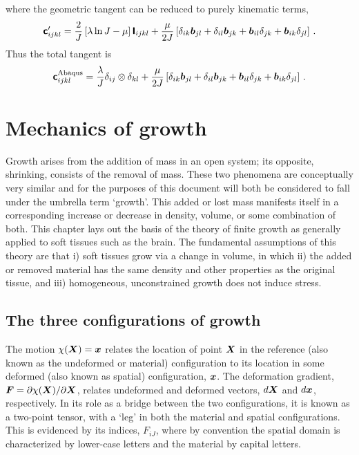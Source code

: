 \documentclass[10pt,letterpaper,oneside]{report}
\newcommand{\ten}[1]{\mbox{\boldmath $#1$}{}}
\newcommand{\tenf}[1]{\mbox{{\sffamily{\bfseries {#1}}}}}
\newcommand{\scas}[1]{\mbox{{\scriptsize{${\rm{#1}}$}}}{}}
\begin{document}
where the geometric tangent can be reduced to purely kinematic terms, 
\begin{equation}
\tenf{c}'_{ijkl} = \frac{2}{J} \left[ \lambda \ln J - \mu \right] \tenf{I}_{ijkl} + \frac{\mu}{2 J} \left[ \delta_{ik} \ten{b}_{jl} + \delta_{il} \ten{b}_{jk} + \ten{b}_{il} \delta_{jk} + \ten{b}_{ik} \delta_{jl} \right] \, . 
\end{equation}
Thus the total tangent is
\begin{equation}
\tenf{c}^{\scas{Abaqus}}_{ijkl} = \frac{\lambda}{J} \delta_{ij} \otimes \delta_{kl} + \frac{\mu}{2 J} \left[ \delta_{ik} \ten{b}_{jl} + \delta_{il} \ten{b}_{jk} + \ten{b}_{il} \delta_{jk} + \ten{b}_{ik} \delta_{jl} \right] \, . 
\end{equation}



\chapter{Mechanics of growth}
\label{chap:mechofgrowth}
Growth arises from the addition of mass in an open system; its opposite, shrinking, consists of the removal of mass.  These two phenomena are conceptually very similar and for the purposes of this document will both be considered to fall under the umbrella term `growth'.  This added or lost mass manifests itself in a corresponding increase or decrease in density, volume, or some combination of both.  
This chapter lays out the basis of the theory of finite growth as generally applied to soft tissues such as the brain.  The fundamental assumptions of this theory are that i) soft tissues grow via a change in volume, in which ii) the added or removed material has the same density and other properties as the original tissue, and iii) homogeneous, unconstrained growth does not induce stress.

\section{The three configurations of growth} \label{multiplicativedecomposition}

The motion $\chi ( \ten{X} ) = \ten{x}$ relates the location of point $\ten{X}$ in the reference (also known as the undeformed or material) configuration to its location in some deformed (also known as spatial) configuration, $\ten{x}$.  The deformation gradient, $\ten{F} = \partial \chi ( \ten{X} ) / \partial \ten{X}$, relates undeformed and deformed vectors, $d \ten{X}$ and $d \ten{x}$, respectively.  In its role as a bridge between the two configurations, it is known as a two-point tensor, with a `leg' in both the material and spatial configurations.  This is evidenced by its indices, $F_{iJ}$, where by convention the spatial domain is characterized by lower-case letters and the material by capital letters.
\end{document}

